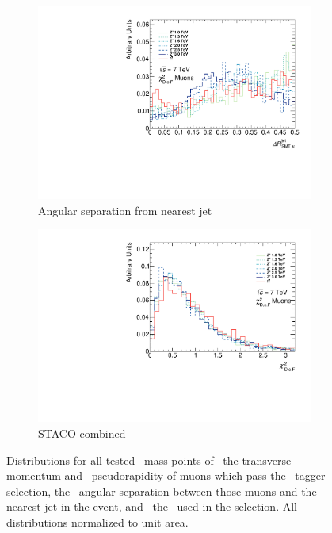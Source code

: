 \begin{figure}[htbp]
  \begin{subfigure}{0.48\textwidth}
    \includegraphics[width=\textwidth]{PartBoosted/Plots/h_smt_jet_dr.pdf}
    \caption{Angular separation from nearest jet} \label{fig:BoostedControlSMTdr}
  \end{subfigure}
  \begin{subfigure}{0.48\textwidth}
    \includegraphics[width=\textwidth]{PartBoosted/Plots/h_smt_chi2.pdf}
    \caption{STACO combined \xsd} \label{fig:BoostedControlSMTchi2}
  \end{subfigure}

  \caption[Distributions for all tested \Zprime\ mass points of the transverse momentum and pseudorapidity of muons which pass the \xsm\ tagger selection, the angular separation between those muons and the nearest jet in the event, and the \xsm\ used in the selection.]{Distributions for all tested \Zprime\ mass points of~ the transverse momentum and~ pseudorapidity of muons which pass the \xsm\ tagger selection, the~ angular separation between those muons and the nearest jet in the event, and~ the \xsm\ used in the selection. All distributions normalized to unit area.} \label{fig:BoostedControlSMT}
\end{figure}

